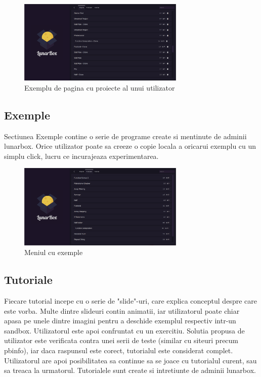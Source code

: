 \documentclass{article}
\begin{document}
\begin{figure}[h]
	\centering
	\includegraphics[width=300px]{projects.png}
	\caption{Exemplu de pagina cu proiecte al unui utilizator}
\end{figure}

\subsection{Exemple}
Sectiunea Exemple contine o serie de programe create si mentinute de adminii lunarbox.
Orice utilizator poate sa creeze o copie locala a oricarui exemplu cu un simplu click, lucru ce incurajeaza experimentarea.

\begin{figure}[h]
	\centering
	\includegraphics[width=300px]{examples.png}
	\caption{Meniul cu exemple}
\end{figure}

\subsection{Tutoriale}
Fiecare tutorial incepe cu o serie de "slide"-uri, care explica conceptul despre care este vorba.
Multe dintre slideuri contin animatii, iar utilizatorul poate chiar apasa pe unele dintre imagini pentru a deschide exemplul respectiv intr-un sandbox.
Utilizatorul este apoi confruntat cu un exercitiu.
Solutia propusa de utilizator este verificata contra unei serii de teste (similar cu siteuri precum pbinfo), iar daca raspunsul este corect, tutorialul este considerat complet.
Utilizatorul are apoi posibilitatea sa continue sa se joace cu tutorialul curent, sau sa treaca la urmatorul.
Tutorialele sunt create si intretiunte de adminii lunarbox.
\end{document}
